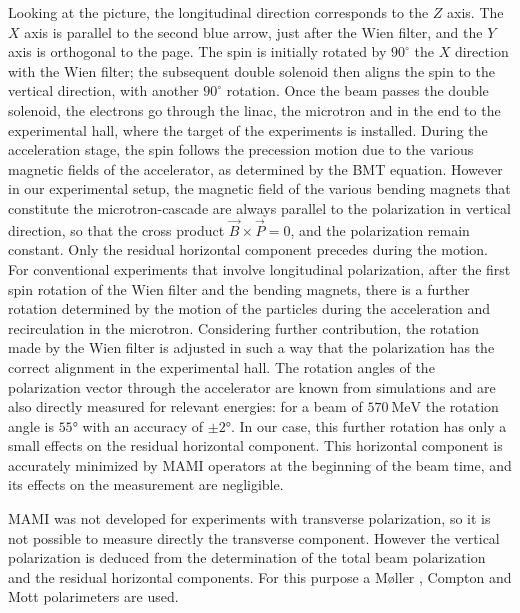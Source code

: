 Looking at the picture, the longitudinal direction corresponds to the $Z$ axis. The $X$ axis is parallel to the second blue arrow, just after the Wien filter, and the $Y$ axis is orthogonal to the page. 
The spin is initially rotated by $90^{\circ}$ the $X$ direction with the Wien filter; the subsequent double solenoid then aligns the spin to the vertical direction, with another $90^{\circ}$ rotation. 
Once the beam passes the double solenoid, the electrons go through the linac, the microtron and in the end to the experimental hall, where the target of the experiments is installed. During the acceleration stage, the spin follows the precession motion due to the various magnetic fields of the accelerator, as determined by the BMT equation. However in our experimental setup, the magnetic field of the various bending magnets that constitute the microtron-cascade are always parallel to the polarization in vertical direction, so that the cross product $\vec{B} \times \vec{P} = 0$, and the polarization remain constant. Only the residual horizontal component precedes during the motion. For conventional experiments that involve longitudinal polarization, after the first spin rotation of the Wien filter and the bending magnets, there is a further rotation determined by the motion of the particles during the acceleration and recirculation in the microtron. Considering further contribution, the rotation made by the Wien filter is adjusted in such a way that the polarization has the correct alignment in the experimental hall. The rotation angles of the polarization vector through the accelerator are known from simulations and are also directly measured for relevant energies: for a beam of $\SI{570}{\mega \electronvolt}$ the rotation angle is $\ang{55}$ with an accuracy of $\pm \ang{2}$. In our case, this further rotation has only a small effects on the residual horizontal component. This horizontal component is accurately minimized by MAMI operators at the beginning of the beam time, and its effects on the measurement are negligible. 

MAMI was not developed for experiments with transverse polarization, so it is not possible to measure directly the transverse component. However the vertical polarization is deduced from the determination of the total beam polarization and the residual horizontal components. For this purpose a M\o ller , Compton and Mott polarimeters are used.

